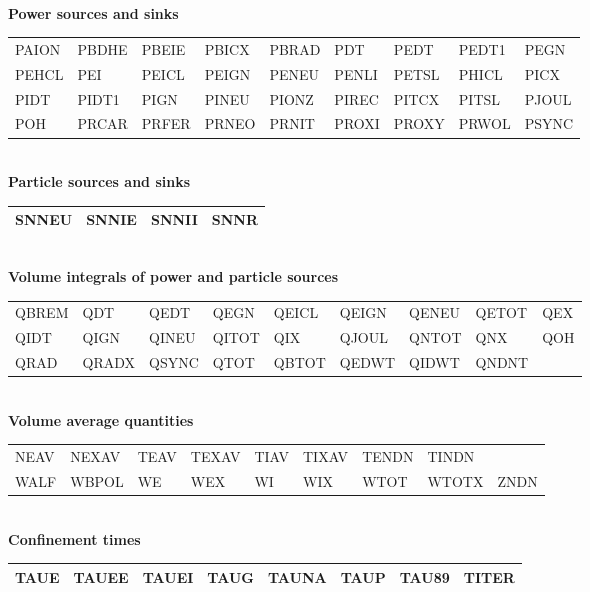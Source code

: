 \bigskip
\\
\noindent
{\bf Power sources and sinks}\\[1ex]
{\tt\begin{tabular}
{|p{13mm}p{13mm}p{13mm}p{13mm}p{13mm}p{13mm}p{13mm}p{13mm}p{13mm}|}   \hline
PAION	& PBDHE	& PBEIE	& PBICX	& PBRAD	& PDT	& PEDT	& PEDT1	& PEGN	\\
PEHCL	& PEI	& PEICL	& PEIGN	& PENEU	& PENLI	& PETSL	& PHICL	& PICX	\\
PIDT	& PIDT1	& PIGN	& PINEU	& PIONZ	& PIREC	& PITCX	& PITSL	& PJOUL	\\
POH	& PRCAR	& PRFER	& PRNEO	& PRNIT	& PROXI	& PROXY	& PRWOL	& PSYNC \\
\hline
\end{tabular}}
\bigskip
\\
\noindent
{\bf Particle sources and sinks}\\[1ex]
{\tt\begin{tabular}
{|p{13mm}p{13mm}p{13mm}p{13mm}|}				\hline
SNNEU	& SNNIE	& SNNII	& SNNR	\\			\hline
\end{tabular}}
\bigskip
\\
\noindent
{\bf Volume integrals of power and particle sources}\\[1ex]
{\tt\begin{tabular}
{|p{13mm}p{13mm}p{13mm}p{13mm}p{13mm}p{13mm}p{13mm}p{13mm}p{13mm}|} \hline
QBREM	& QDT	& QEDT	& QEGN	& QEICL	& QEIGN	& QENEU	& QETOT	& QEX\\
QIDT	& QIGN	& QINEU	& QITOT	& QIX	& QJOUL	& QNTOT	& QNX	& QOH\\
QRAD	& QRADX	& QSYNC	& QTOT	& QBTOT	& QEDWT	& QIDWT	& QNDNT	&\\ \hline
\end{tabular}}
\bigskip
\\
\noindent
{\bf Volume average quantities}\\[1ex]
{\tt\begin{tabular}
{|p{13mm}p{13mm}p{13mm}	p{13mm}	p{13mm}	p{13mm}	p{13mm}	p{13mm} p{13mm}|}
\hline
NEAV	& NEXAV	& TEAV	& TEXAV	& TIAV	& TIXAV	& TENDN	& TINDN &     \\
WALF	& WBPOL	& WE	& WEX	& WI	& WIX	& WTOT	& WTOTX	& ZNDN\\ 
\hline
\end{tabular}} 
\bigskip
\\
\noindent
{\bf Confinement times}\\[1ex]
{\tt\begin{tabular}
{|p{13mm}p{13mm}p{13mm}	p{13mm}	p{13mm}	p{13mm}	p{13mm}	p{13mm}|} \hline
TAUE	& TAUEE	& TAUEI	& TAUG	& TAUNA	& TAUP	& TAU89	& TITER\\ \hline
\end{tabular}}
